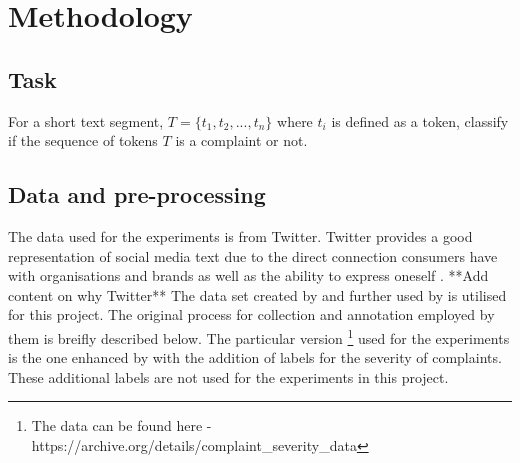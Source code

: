 \chapter{Methodology}

\section{Task}
For a short text segment, $T = \{t_1, t_2, ..., t_n\}$ where $t_i$ is defined as a token, classify if the sequence of tokens $T$ is a complaint or not.

\section{Data and pre-processing}
The data used for the experiments is from Twitter. Twitter provides a good representation of social media text due to the direct connection consumers have with organisations and brands as well as the ability to express oneself \cite{preotiuc-pietro_automatically_2019}. **Add content on why Twitter**
\newline \newline
The data set created by \cite{preotiuc-pietro_automatically_2019} and further used by \cite{jin_complaint_2020} is utilised for this project. The original process for collection and annotation employed by them is breifly described below. The particular version \footnote{The data can be found here - https://archive.org/details/complaint\_severity\_data} used for the experiments is the one enhanced by \cite{jinModelingSeverityComplaints2021} with the addition of labels for the severity of complaints. These additional labels are not used for the experiments in this project.
